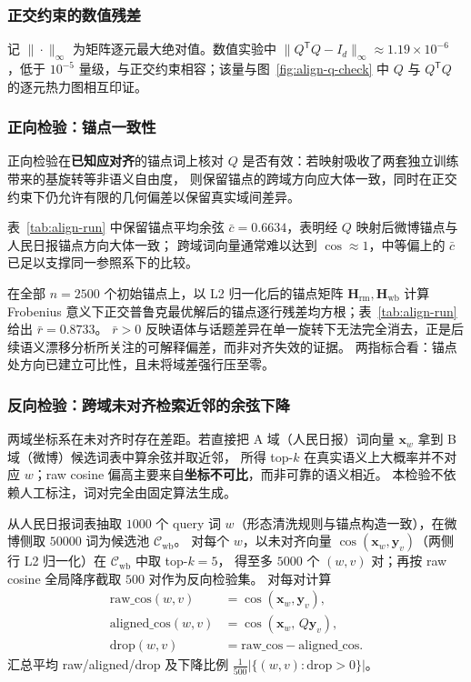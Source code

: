 \documentclass[withoutpreface]{cumcmthesis}
\begin{document}
\subsubsection{正交约束的数值残差}
记 $\|\cdot\|_\infty$ 为矩阵逐元最大绝对值。数值实验中 $\|Q^{\mathsf{T}}Q-I_d\|_\infty\approx 1.19\times10^{-6}$
，低于 $10^{-5}$ 量级，与正交约束相容；该量与图~\ref{fig:align-q-check} 中 $Q$ 与 $Q^{\mathsf{T}}Q$ 的逐元热力图相互印证。

\subsubsection{正向检验：锚点一致性}
正向检验在\textbf{已知应对齐}的锚点词上核对 $Q$ 是否有效：若映射吸收了两套独立训练带来的基旋转等非语义自由度，
则保留锚点的跨域方向应大体一致，同时在正交约束下仍允许有限的几何偏差以保留真实域间差异。

表~\ref{tab:align-run} 中保留锚点平均余弦 $\bar{c}=0.6634$，表明经 $Q$ 映射后微博锚点与人民日报锚点方向大体一致；
跨域词向量通常难以达到 $\cos\approx1$，中等偏上的 $\bar{c}$ 已足以支撑同一参照系下的比较。

在全部 $n=2500$ 个初始锚点上，以 L2 归一化后的锚点矩阵 $\mathbf{H}_{\mathrm{rm}},\mathbf{H}_{\mathrm{wb}}$ 计算 Frobenius 意义下正交普鲁克最优解后的锚点逐行残差均方根；表~\ref{tab:align-run} 给出 $\bar{r}=0.8733$。
$\bar{r}>0$ 反映语体与话题差异在单一旋转下无法完全消去，正是后续语义漂移分析所关注的可解释偏差，而非对齐失效的证据。
两指标合看：锚点处方向已建立可比性，且未将域差强行压至零。

\subsubsection{反向检验：跨域未对齐检索近邻的余弦下降}
两域坐标系在未对齐时存在差距。若直接把 A 域（人民日报）词向量 $\mathbf{x}_w$ 拿到 B 域（微博）候选词表中算余弦并取近邻，
所得 top-$k$ 在真实语义上大概率并不对应 $w$；raw cosine 偏高主要来自\textbf{坐标不可比}，而非可靠的语义相近。
本检验不依赖人工标注，词对完全由固定算法生成。

从人民日报词表抽取 $1000$ 个 query 词 $w$（形态清洗规则与锚点构造一致），在微博侧取 $50000$ 词为候选池 $\mathcal{C}_{\mathrm{wb}}$。
对每个 $w$，以未对齐向量 $\cos(\mathbf{x}_w,\mathbf{y}_v)$（两侧行 L2 归一化）在 $\mathcal{C}_{\mathrm{wb}}$ 中取 top-$k=5$，
得至多 $5000$ 个 $(w,v)$ 对；再按 raw cosine 全局降序截取 $500$ 对作为反向检验集。
对每对计算
\begin{align}
  \mathrm{raw\_cos}(w,v) &= \cos(\mathbf{x}_w,\mathbf{y}_v), \\
  \mathrm{aligned\_cos}(w,v) &= \cos(\mathbf{x}_w,\,Q\mathbf{y}_v), \\
  \mathrm{drop}(w,v) &= \mathrm{raw\_cos}-\mathrm{aligned\_cos}.
\end{align}
汇总平均 raw/aligned/drop 及下降比例 $\frac{1}{500} | \{(w,v):\mathrm{drop}>0\}| $。
\end{document}
